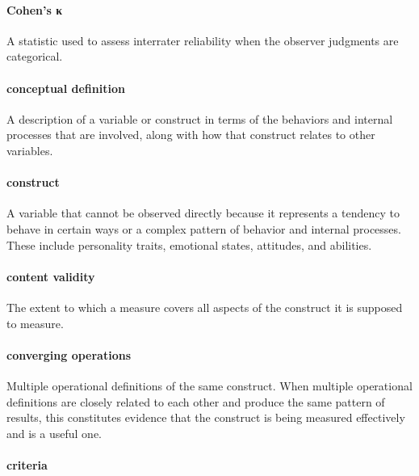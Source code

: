 \documentclass[
]{krantz}
\begin{document}
\paragraph*{Cohen's κ}\label{cohens-ux3ba}

A statistic used to assess interrater reliability when the observer judgments are categorical.

\paragraph*{conceptual definition}\label{conceptual-definition}

A description of a variable or construct in terms of the behaviors and internal processes that are involved, along with how that construct relates to other variables.

\paragraph*{construct}\label{construct}

A variable that cannot be observed directly because it represents a tendency to behave in certain ways or a complex pattern of behavior and internal processes. These include personality traits, emotional states, attitudes, and abilities.

\paragraph*{content validity}\label{content-validity-1}

The extent to which a measure covers all aspects of the construct it is supposed to measure.

\paragraph*{converging operations}\label{converging-operations}

Multiple operational definitions of the same construct. When multiple operational definitions are closely related to each other and produce the same pattern of results, this constitutes evidence that the construct is being measured effectively and is a useful one.

\paragraph*{criteria}\label{criteria}
\end{document}
